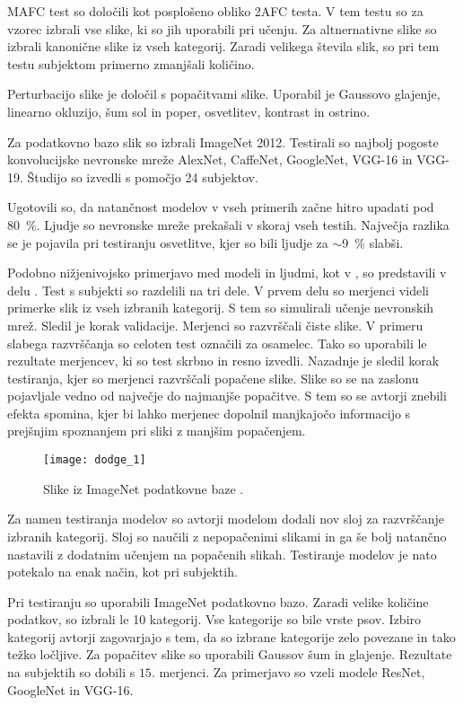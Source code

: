 MAFC test so določili kot posplošeno obliko 2AFC testa. V tem testu so za vzorec izbrali vse slike, ki so jih uporabili pri učenju. Za altnernativne slike so izbrali kanonične slike iz vseh kategorij. Zaradi velikega števila slik, so pri tem testu subjektom primerno zmanjšali količino.

Perturbacijo slike je  določil s popačitvami slike. Uporabil je Gaussovo glajenje, linearno okluzijo, šum sol in poper, osvetlitev, kontrast in ostrino.

Za podatkovno bazo slik so izbrali ImageNet 2012. Testirali so najbolj pogoste konvolucijske nevronske mreže AlexNet, CaffeNet, GoogleNet, VGG-16 in VGG-19. Študijo so izvedli s pomočjo 24 subjektov.

Ugotovili so, da natančnost modelov v vseh primerih začne hitro upadati pod \SI{80}{\%}. Ljudje so nevronske mreže prekašali v skoraj vseh testih. Največja razlika se je pojavila pri testiranju osvetlitve, kjer so bili ljudje za $\sim$\SI{9}{\%} slabši. 

Podobno nižjenivojsko primerjavo med modeli in ljudmi,  kot v \cite{richardwebster2016psyphy}, so predstavili v delu \cite{dodge2017a}. Test s subjekti so razdelili na tri dele. V prvem delu so merjenci videli primerke slik iz vseh izbranih kategorij. S tem so simulirali učenje nevronskih mrež. Sledil je korak validacije. Merjenci so razvrščali čiste slike. V primeru slabega razvrščanja so celoten test označili za osamelec. Tako so uporabili le rezultate merjencev, ki so test skrbno in resno izvedli. Nazadnje je sledil korak testiranja, kjer so merjenci razvrščali popačene slike. Slike so se na zaslonu pojavljale vedno od največje do najmanjše popačitve. S tem so se avtorji znebili efekta spomina, kjer bi lahko merjenec dopolnil manjkajočo informacijo s prejšnjim spoznanjem pri sliki z manjšim popačenjem. 

\begin{figure}[!htbp]
	\centering
	\texttt{[image: dodge\_1]}
	\caption{Slike iz ImageNet podatkovne baze \cite{deng2009imagenet}.}
\end{figure}

Za namen testiranja modelov so avtorji modelom dodali nov sloj za razvrščanje izbranih kategorij. Sloj so naučili z nepopačenimi slikami in ga še bolj natančno nastavili z dodatnim učenjem na popačenih slikah. Testiranje modelov je nato potekalo na enak način, kot pri subjektih.

Pri testiranju so  uporabili ImageNet podatkovno bazo. Zaradi velike količine podatkov, so izbrali le 10 kategorij. Vse kategorije so bile vrste psov. Izbiro kategorij avtorji zagovarjajo s tem, da so izbrane kategorije zelo povezane in tako težko ločljive. Za popačitev slike so uporabili Gaussov šum in glajenje. Rezultate na subjektih so dobili s $15$. merjenci. Za primerjavo so vzeli modele ResNet, GoogleNet in VGG-16. 

